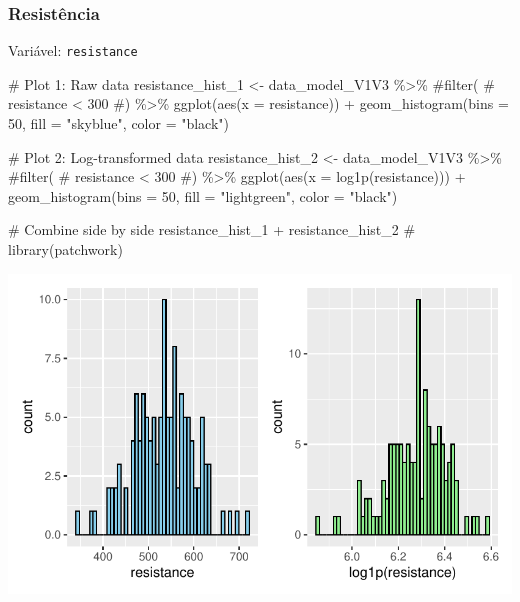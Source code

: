 \documentclass[
  12pt,
]{article}
\newenvironment{Shaded}{\begin{snugshade}}{\end{snugshade}}
\newcommand{\AttributeTok}[1]{\textcolor[rgb]{0.40,0.45,0.13}{#1}}
\newcommand{\CommentTok}[1]{\textcolor[rgb]{0.37,0.37,0.37}{#1}}
\newcommand{\DecValTok}[1]{\textcolor[rgb]{0.68,0.00,0.00}{#1}}
\newcommand{\FunctionTok}[1]{\textcolor[rgb]{0.28,0.35,0.67}{#1}}
\newcommand{\NormalTok}[1]{\textcolor[rgb]{0.00,0.23,0.31}{#1}}
\newcommand{\OtherTok}[1]{\textcolor[rgb]{0.00,0.23,0.31}{#1}}
\newcommand{\SpecialCharTok}[1]{\textcolor[rgb]{0.37,0.37,0.37}{#1}}
\newcommand{\StringTok}[1]{\textcolor[rgb]{0.13,0.47,0.30}{#1}}
\begin{document}
\subsubsection{Resistência}\label{resistuxeancia}

Variável: \texttt{resistance}

\begin{Shaded}
\begin{Highlighting}[]
\CommentTok{\# Plot 1: Raw data}
\NormalTok{resistance\_hist\_1 }\OtherTok{\textless{}{-}}\NormalTok{ data\_model\_V1V3 }\SpecialCharTok{\%\textgreater{}\%} 
    \CommentTok{\#filter(}
    \CommentTok{\#    resistance \textless{} 300}
    \CommentTok{\#) \%\textgreater{}\% }
    \FunctionTok{ggplot}\NormalTok{(}\FunctionTok{aes}\NormalTok{(}\AttributeTok{x =}\NormalTok{ resistance)) }\SpecialCharTok{+} 
    \FunctionTok{geom\_histogram}\NormalTok{(}\AttributeTok{bins =} \DecValTok{50}\NormalTok{, }\AttributeTok{fill =} \StringTok{"skyblue"}\NormalTok{, }\AttributeTok{color =} \StringTok{"black"}\NormalTok{)}

\CommentTok{\# Plot 2: Log{-}transformed data}
\NormalTok{resistance\_hist\_2 }\OtherTok{\textless{}{-}}\NormalTok{ data\_model\_V1V3 }\SpecialCharTok{\%\textgreater{}\%} 
    \CommentTok{\#filter(}
    \CommentTok{\#    resistance \textless{} 300}
    \CommentTok{\#) \%\textgreater{}\%}
    \FunctionTok{ggplot}\NormalTok{(}\FunctionTok{aes}\NormalTok{(}\AttributeTok{x =} \FunctionTok{log1p}\NormalTok{(resistance))) }\SpecialCharTok{+} 
    \FunctionTok{geom\_histogram}\NormalTok{(}\AttributeTok{bins =} \DecValTok{50}\NormalTok{, }\AttributeTok{fill =} \StringTok{"lightgreen"}\NormalTok{, }\AttributeTok{color =} \StringTok{"black"}\NormalTok{)}

\CommentTok{\# Combine side by side}
\NormalTok{resistance\_hist\_1 }\SpecialCharTok{+}\NormalTok{ resistance\_hist\_2 }\CommentTok{\# library(patchwork)}
\end{Highlighting}
\end{Shaded}

\includegraphics{Outcomes_files/figure-pdf/resistance_1-1.pdf}
\end{document}
